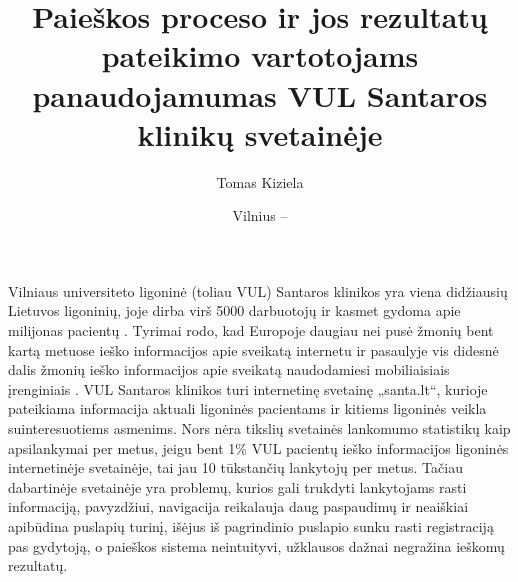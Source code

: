 \documentclass{VUMIFPSkursinis}
\title{Paieškos proceso ir jos rezultatų pateikimo vartotojams panaudojamumas VUL Santaros klinikų svetainėje}
\author{Tomas Kiziela}
\date{Vilnius – \the\year}
\begin{document}
	
\maketitle
\cleardoublepage{}
\setcounter{page}{2}




Vilniaus universiteto ligoninė (toliau VUL) Santaros klinikos yra viena didžiausių Lietuvos ligoninių, joje dirba virš 5000 darbuotojų ir kasmet gydoma apie milijonas pacientų \cite{VulSkApieMusLt}. Tyrimai rodo, kad Europoje daugiau nei pusė žmonių bent kartą metuose ieško informacijos apie sveikatą internetu \cite{EuCitizDigHealthEn} ir pasaulyje vis didesnė dalis žmonių ieško informacijos apie sveikatą naudodamiesi mobiliaisiais įrenginiais \cite{EmergingmHealthEn}. VUL Santaros klinikos turi internetinę svetainę „santa.lt“, kurioje pateikiama informacija aktuali ligoninės pacientams ir kitiems ligoninės veikla suinteresuotiems asmenims. Nors nėra tikslių svetainės lankomumo statistikų kaip apsilankymai per metus, jeigu bent 1\% VUL pacientų ieško informacijos ligoninės internetinėje svetainėje, tai jau 10 tūkstančių lankytojų per metus. Tačiau dabartinėje svetainėje yra problemų, kurios gali trukdyti lankytojams rasti informaciją, pavyzdžiui, navigacija reikalauja daug paspaudimų ir neaiškiai apibūdina puslapių turinį, išėjus iš pagrindinio puslapio sunku rasti registraciją pas gydytoją, o paieškos sistema neintuityvi, užklausos dažnai negražina ieškomų rezultatų.



\end{document}
